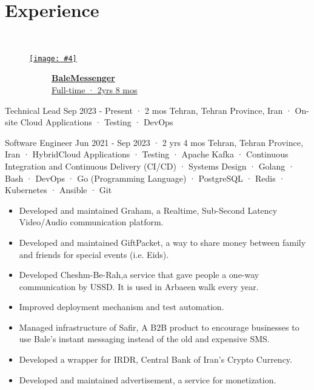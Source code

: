 \documentclass[a4paper,20pt]{article}
\newcommand{\companyHeadingWithImage}[4]{
    \vspace{-24pt}
    \begin{figure}[H]
        \href{#2}{\texttt{[image: \#4]}}
        \vspace{-37.5pt}
    \end{figure}
    ~~~~~~~~~~~\textbf{\href{#2}{#1}} \\
    ~~~~~~~~~~~\href{#2}{#3}
    \vspace{6pt}
}
\newcounter{mylist} %
\newenvironment{myitemize}{%
  \stepcounter{mylist}%
  \begin{itemize}
}{\end{itemize}%
  }
\begin{document}
\section{Experience}\
    \companyHeadingWithImage{BaleMessenger}{https://www.linkedin.com/company/balemessenger}{Full-time · 2yrs 8 mos}{bale}
    \begin{myitemize}
        \begin{newexperience}                
            {Technical Lead}
            {Sep 2023 - Present · 2 mos}
            {Tehran, Tehran Province, Iran · On-site}
            {Cloud Applications · Testing · DevOps}
        \end{newexperience}

        \begin{newexperiencewithdesc}
            {Software Engineer}
            {Jun 2021 - Sep 2023 · 2 yrs 4 mos}
            {Tehran, Tehran Province, Iran · Hybrid}{Cloud Applications · Testing · Apache Kafka · Continuous Integration and Continuous Delivery (CI/CD) · Systems Design · Golang · Bash · DevOps · Go (Programming Language) · PostgreSQL · Redis · Kubernetes · Ansible · Git}
            {
                \begin{itemize}
                    \item Developed and maintained Graham, a Realtime, Sub-Second Latency Video/Audio communication platform.
                    \item Developed and maintained GiftPacket, a way to share money between family and friends for special events (i.e. Eids).
                    \item Developed Cheshm-Be-Rah,a service that gave people a one-way communication by USSD. It is used in Arbaeen walk every year.
                    \item Improved deployment mechanism and test automation.
                    \item Managed infrastructure of Safir, A B2B product to encourage 
                    businesses to use Bale's instant messaging instead of the old and 
                    expensive SMS.
                    \item Developed a wrapper for IRDR, Central Bank of Iran's Crypto Currency.
                    \item Developed and maintained advertisement, a service for monetization.
                \end{itemize}
            }
        \end{newexperiencewithdesc}


\end{myitemize}
\end{document}
